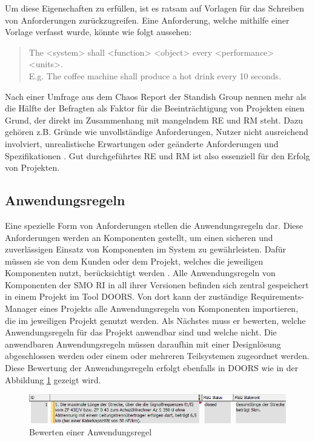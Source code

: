 Um diese Eigenschaften zu erfüllen, ist es ratsam auf Vorlagen für das Schreiben von Anforderungen zurückzugreifen. Eine Anforderung, welche mithilfe
einer Vorlage verfasst wurde, könnte wie folgt aussehen:
\begin{quote}
    \glqq The <system> shall <function> <object> every <performance> <units>.\\
    E.g. The coffee machine shall produce a hot drink every 10 seconds. \grqq{} \cite[S.81]{DOORS}
\end{quote}

Nach einer Umfrage aus dem Chaos Report der Standish Group nennen mehr als die Hälfte der Befragten als Faktor für die Beeinträchtigung von Projekten
einen Grund, der direkt im Zusammenhang mit mangelndem \ac{RE} und \ac{RM} steht. Dazu gehören z.B. Gründe wie unvollständige Anforderungen, Nutzer nicht
ausreichend involviert, unrealistische Erwartungen oder geänderte Anforderungen und Spezifikationen \cite[vgl. S.5]{Chaos}. Gut durchgeführtes 
\ac{RE} und \ac{RM} ist also essenziell für den Erfolg von Projekten.

\subsection{Anwendungsregeln}
Eine spezielle Form von Anforderungen stellen die Anwendungsregeln dar. Diese Anforderungen werden an Komponenten gestellt, um einen sicheren
und zuverlässigen Einsatz von Komponenten im System zu gewährleisten. Dafür müssen sie von dem Kunden oder dem Projekt, welches die jeweiligen 
Komponenten nutzt, berücksichtigt werden \cite[vgl. S.9]{SMO-AR}. Alle Anwendungsregeln von Komponenten der \ac{SMO RI} in all ihrer Versionen
befinden sich zentral gespeichert in einem Projekt im Tool \ac{DOORS}. Von dort kann der zuständige Requirements-Manager eines Projekts alle 
Anwendungsregeln von Komponenten importieren, die im jeweiligen Projekt genutzt werden. Als Nächstes muss er bewerten, welche 
Anwendungsregeln für das Projekt anwendbar sind und welche nicht. Die anwendbaren Anwendungsregeln müssen daraufhin mit einer Designlösung
abgeschlossen werden oder einem oder mehreren Teilsystemen zugeordnet werden. Diese Bewertung der Anwendungsregeln erfolgt ebenfalls in \ac{DOORS}
wie in der Abbildung \ref*{fig:BewerteteAR} gezeigt wird.

\begin{figure}[H]
    \centering
    \includegraphics[width = \textwidth]{abbildungen/Bewertete AR.png}
    \caption{Bewerten einer Anwendungsregel}
    \label{fig:BewerteteAR}
\end{figure}

